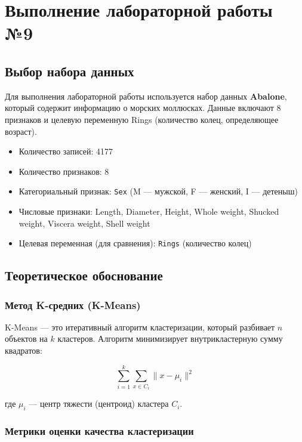 \chapter{Выполнение лабораторной работы №9}
\label{ch:lab9}

\section{Выбор набора данных}

Для выполнения лабораторной работы используется набор данных \textbf{Abalone}, который содержит информацию о морских моллюсках. Данные включают 8 признаков и целевую переменную Rings (количество колец, определяющее возраст).

\begin{itemize}
    \item Количество записей: 4177
    \item Количество признаков: 8
    \item Категориальный признак: \texttt{Sex} (M --- мужской, F --- женский, I --- детеныш)
    \item Числовые признаки: Length, Diameter, Height, Whole weight, Shucked weight, Viscera weight, Shell weight
    \item Целевая переменная (для сравнения): \texttt{Rings} (количество колец)
\end{itemize}

\section{Теоретическое обоснование}

\subsection{Метод K-средних (K-Means)}

K-Means — это итеративный алгоритм кластеризации, который разбивает $n$ объектов на $k$ кластеров. Алгоритм минимизирует внутрикластерную сумму квадратов:

\begin{equation}
\sum_{i=1}^{k} \sum_{x \in C_i} \|x - \mu_i\|^2
\label{eq:kmeans}
\end{equation}

где $\mu_i$ — центр тяжести (центроид) кластера $C_i$.

\subsection{Метрики оценки качества кластеризации}

